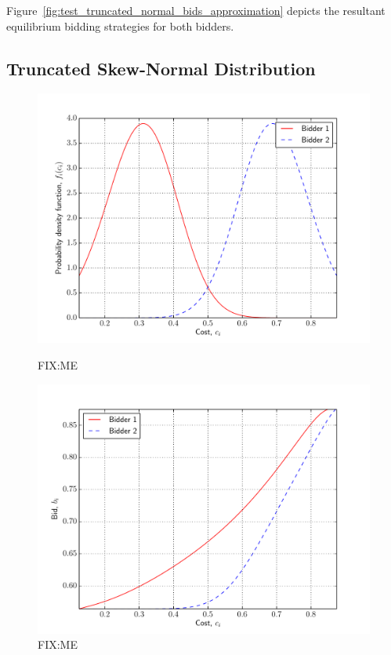 Figure~\ref{fig:test_truncated_normal_bids_approximation} depicts the resultant equilibrium bidding strategies for both bidders.


\subsection{Truncated Skew-Normal Distribution} %
\label{sub:truncated_skew_normal_distribution_approximation}

\begin{figure}[p!]
  \includegraphics[width=\figsize]{Approximation/Figures/test_skew_normal_pdfs}
  \caption{FIX:ME}
  \label{fig:test_skew_normal_pdfs_approximation}
  \vspace{10mm}
  \includegraphics[width=\figsize]{Approximation/Figures/test_skew_normal_bids}
  \caption{FIX:ME}
  \label{fig:test_skew_normal_bids_approximation}
\end{figure}

